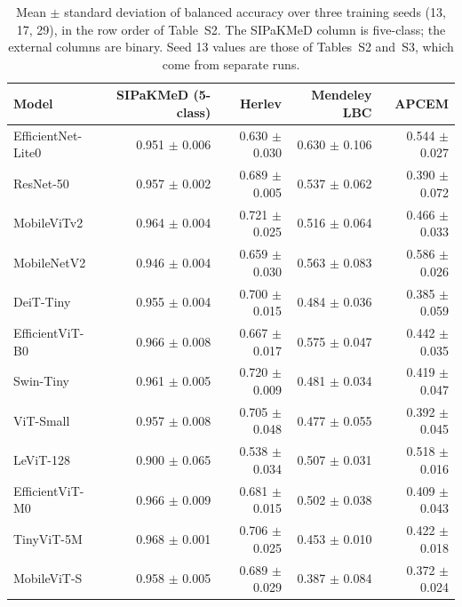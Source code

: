 \documentclass[12pt,letterpaper]{article}
\begin{document}
\begin{table}[htbp]
\centering
\caption{Mean $\pm$ standard deviation of balanced accuracy over three training seeds (13, 17, 29), in the row order of Table~S2. The SIPaKMeD column is five-class; the external columns are binary. Seed 13 values are those of Tables~S2 and~S3, which come from separate runs.}
\label{tab:seeds}
\footnotesize
\begin{tabular}{lrrrr}
\toprule
Model & SIPaKMeD (5-class) & Herlev & Mendeley LBC & APCEM \\
\midrule
EfficientNet-Lite0 & 0.951 $\pm$ 0.006 & 0.630 $\pm$ 0.030 & 0.630 $\pm$ 0.106 & 0.544 $\pm$ 0.027 \\
ResNet-50 & 0.957 $\pm$ 0.002 & 0.689 $\pm$ 0.005 & 0.537 $\pm$ 0.062 & 0.390 $\pm$ 0.072 \\
MobileViTv2 & 0.964 $\pm$ 0.004 & 0.721 $\pm$ 0.025 & 0.516 $\pm$ 0.064 & 0.466 $\pm$ 0.033 \\
MobileNetV2 & 0.946 $\pm$ 0.004 & 0.659 $\pm$ 0.030 & 0.563 $\pm$ 0.083 & 0.586 $\pm$ 0.026 \\
DeiT-Tiny & 0.955 $\pm$ 0.004 & 0.700 $\pm$ 0.015 & 0.484 $\pm$ 0.036 & 0.385 $\pm$ 0.059 \\
EfficientViT-B0 & 0.966 $\pm$ 0.008 & 0.667 $\pm$ 0.017 & 0.575 $\pm$ 0.047 & 0.442 $\pm$ 0.035 \\
Swin-Tiny & 0.961 $\pm$ 0.005 & 0.720 $\pm$ 0.009 & 0.481 $\pm$ 0.034 & 0.419 $\pm$ 0.047 \\
ViT-Small & 0.957 $\pm$ 0.008 & 0.705 $\pm$ 0.048 & 0.477 $\pm$ 0.055 & 0.392 $\pm$ 0.045 \\
LeViT-128 & 0.900 $\pm$ 0.065 & 0.538 $\pm$ 0.034 & 0.507 $\pm$ 0.031 & 0.518 $\pm$ 0.016 \\
EfficientViT-M0 & 0.966 $\pm$ 0.009 & 0.681 $\pm$ 0.015 & 0.502 $\pm$ 0.038 & 0.409 $\pm$ 0.043 \\
TinyViT-5M & 0.968 $\pm$ 0.001 & 0.706 $\pm$ 0.025 & 0.453 $\pm$ 0.010 & 0.422 $\pm$ 0.018 \\
MobileViT-S & 0.958 $\pm$ 0.005 & 0.689 $\pm$ 0.029 & 0.387 $\pm$ 0.084 & 0.372 $\pm$ 0.024 \\
\bottomrule
\end{tabular}
\end{table}
\end{document}
